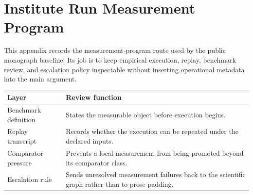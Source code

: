 \section{Institute Run Measurement Program}
This appendix records the measurement-program route used by the public monograph baseline. Its job is to keep empirical execution, replay, benchmark review, and escalation policy inspectable without inserting operational metadata into the main argument.
\begin{longtable}{L{0.28\textwidth}L{0.62\textwidth}}
\toprule
Layer & Review function\\
\midrule
Benchmark definition & States the measurable object before execution begins.\\
Replay transcript & Records whether the execution can be repeated under the declared inputs.\\
Comparator pressure & Prevents a local measurement from being promoted beyond its comparator class.\\
Escalation rule & Sends unresolved measurement failures back to the scientific graph rather than to prose padding.\\
\bottomrule
\end{longtable}
